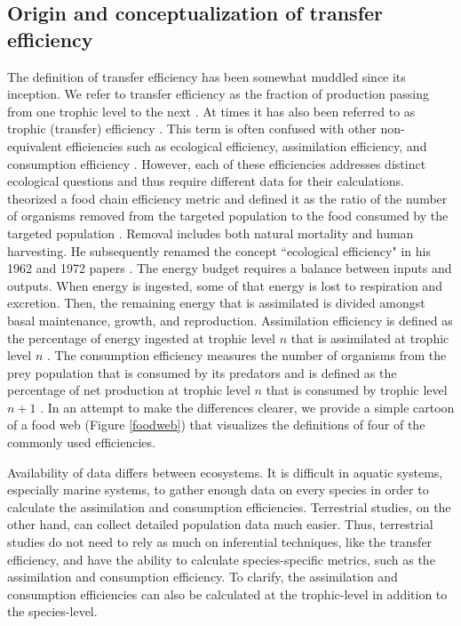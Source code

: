 \documentclass[oneside,12pt,final]{sty/ucthesis-CA2012}
\let\cite\citep                             %
\begin{document}
\begin{mainmatter}
\subsection{Origin and conceptualization of transfer efficiency}
The definition of transfer efficiency has been somewhat muddled since its inception. We refer to transfer efficiency as the fraction of production passing from one trophic level to the next \cite{slobodkin1959energetics}. At times it has also been referred to as trophic (transfer) efficiency \cite{chapman1998ecology}. This term is often confused with other non-equivalent efficiencies such as ecological efficiency, assimilation efficiency, and consumption efficiency \cite{iverson1990control, hairston1993causeeffect}. However, each of these efficiencies addresses distinct ecological questions and thus require different data for their calculations. \citet{slobodkin1959energetics} theorized a food chain efficiency metric and defined it as the ratio of the number of organisms removed from the targeted population to the food consumed by the targeted population \cite{slobodkin1960ecological,slobodkin1962energy}. Removal includes both natural mortality and human harvesting. He subsequently renamed the concept ``ecological efficiency" in his 1962 and 1972 papers \cite{slobodkin1962energy, slobodkin1972inconstancy}. The energy budget requires a balance between inputs and outputs. When energy is ingested, some of that energy is lost to respiration and excretion. Then, the remaining energy that is assimilated is divided amongst basal maintenance, growth, and reproduction. Assimilation efficiency is defined as the percentage of energy ingested at trophic level $n$ that is assimilated at trophic level $n$ \cite{hairston1993causeeffect}. The consumption efficiency measures the number of organisms from the prey population that is consumed by its predators and is defined as the percentage of net production at trophic level $n$ that is consumed by trophic level $n + 1$ \cite{hairston1993causeeffect}. In an attempt to make the differences clearer, we provide a simple cartoon of a food web (Figure \ref{foodweb}) that visualizes the definitions of four of the commonly used efficiencies. 

\vspace{5mm}

Availability of data differs between ecosystems. It is difficult in aquatic systems, especially marine systems, to gather enough data on every species in order to calculate the assimilation and consumption efficiencies. Terrestrial studies, on the other hand, can collect detailed population data much easier. Thus, terrestrial studies do not need to rely as much on inferential techniques, like the transfer efficiency, and have the ability to calculate species-specific metrics, such as the assimilation and consumption efficiency. To clarify, the assimilation and consumption efficiencies can also be calculated at the trophic-level in addition to the species-level.


\end{mainmatter}
\end{document}
